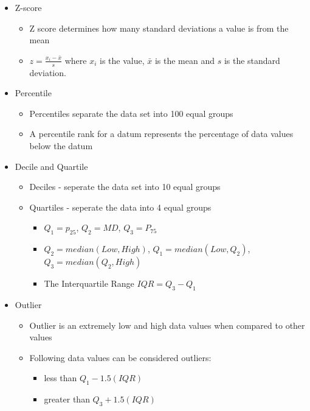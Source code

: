 \documentclass{article}
\begin{document}
\begin{itemize}
	\item Z-score
	\begin{itemize}
		\item Z score determines how many standard deviations a value is from the mean
		\item $z = \frac{x_i - \bar{x}}{s}$ where $x_i$ is the value, $\bar{x}$ is the mean and $s$ is the standard deviation.
	\end{itemize} 
	\item Percentile
	\begin{itemize}
		\item Percentiles separate the data set into 100 equal groups
		\item A percentile rank for a datum represents the percentage of data values below the datum
	\end{itemize}
	\item Decile and Quartile
		\begin{itemize}
			\item Deciles - seperate the data set into 10 equal groups
			\item Quartiles - seperate the data into 4 equal groups
			\begin{itemize}
				\item $Q_1 = p_{25}$, $Q_2=MD$, $Q_3 = P_{75}$
				\item $Q_2 = median(Low, High)$, $Q_1 = median(Low, Q_2)$, $Q_3 = median(Q_2, High)$ 
				\item The Interquartile Range $IQR = Q_3 - Q_1$
			\end{itemize}
		\end{itemize}
	\item Outlier
	\begin{itemize}
		\item Outlier is an extremely low and high data values when compared to other values
		\item Following data values can be considered outliers:
		\begin{itemize}
			\item less than $Q_1 - 1.5(IQR)$
			\item greater than $Q_3 + 1.5(IQR)$
		\end{itemize}
	\end{itemize}
\end{itemize}
\end{document}
